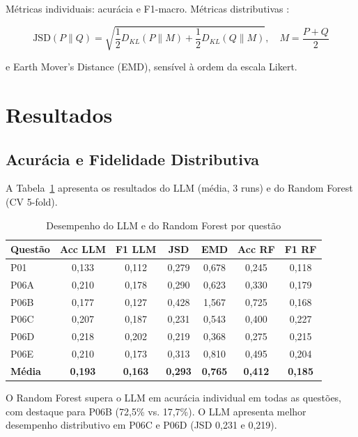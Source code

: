 \documentclass[12pt]{article}
\begin{document}
Métricas individuais: acurácia e F1-macro. Métricas distributivas \cite{miranda2025}:

\begin{equation}
  \text{JSD}(P \| Q) = \sqrt{\frac{1}{2}D_{KL}(P\|M) + \frac{1}{2}D_{KL}(Q\|M)},
  \quad M = \frac{P+Q}{2}
\end{equation}

e Earth Mover's Distance (EMD), sensível à ordem da escala Likert.


\section{Resultados}

\subsection{Acurácia e Fidelidade Distributiva}

A Tabela~\ref{tab:resultados} apresenta os resultados do LLM (média, 3 runs)
e do Random Forest (CV 5-fold).

\begin{table}[ht]
\centering
\caption{Desempenho do LLM e do Random Forest por questão}
\label{tab:resultados}
\small
\begin{tabular}{lcccccc}
\toprule
\textbf{Questão} & \textbf{Acc LLM} & \textbf{F1 LLM} & \textbf{JSD} & \textbf{EMD} & \textbf{Acc RF} & \textbf{F1 RF} \\
\midrule
P01  & 0,133 & 0,112 & 0,279 & 0,678 & 0,245 & 0,118 \\
P06A & 0,210 & 0,178 & 0,290 & 0,623 & 0,330 & 0,179 \\
P06B & 0,177 & 0,127 & 0,428 & 1,567 & 0,725 & 0,168 \\
P06C & 0,207 & 0,187 & 0,231 & 0,543 & 0,400 & 0,227 \\
P06D & 0,218 & 0,202 & 0,219 & 0,368 & 0,275 & 0,215 \\
P06E & 0,210 & 0,173 & 0,313 & 0,810 & 0,495 & 0,204 \\
\midrule
\textbf{Média} & \textbf{0,193} & \textbf{0,163} & \textbf{0,293} & \textbf{0,765} & \textbf{0,412} & \textbf{0,185} \\
\bottomrule
\end{tabular}
\end{table}

O Random Forest supera o LLM em acurácia individual em todas as questões,
com destaque para P06B (72,5\% vs. 17,7\%). O LLM apresenta melhor
desempenho distributivo em P06C e P06D (JSD 0,231 e 0,219).
\end{document}
